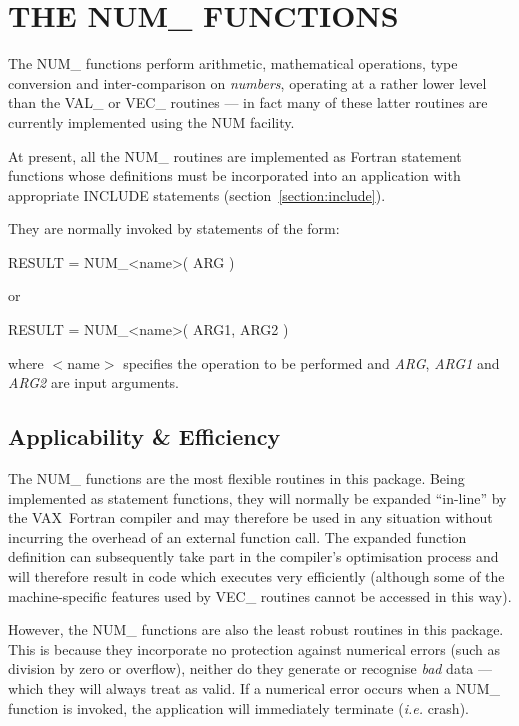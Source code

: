 \documentclass[11pt,nolof]{starlink}
\providecommand{\name}[1]{\mbox{#1}}
\providecommand{\fortvar}[1]{\mbox{\emph{#1}}}
\begin{document}
\section{THE NUM\_ FUNCTIONS}

\label{section:num}

The \name{NUM\_} functions perform arithmetic, mathematical operations, type
conversion and inter-comparison on \emph{numbers}, operating at a rather
lower level than the \name{VAL\_} or \name{VEC\_} routines --- in fact many
of these latter routines are currently implemented using the \name{NUM}
facility.

At present, all the \name{NUM\_} routines are implemented as Fortran
statement functions whose definitions must be incorporated into an
application with appropriate \name{INCLUDE} statements
(section~\ref{section:include}).

They are normally invoked by statements of the form:

\begin{terminalv}
RESULT = NUM_<name>( ARG )
\end{terminalv}
or
\begin{terminalv}
RESULT = NUM_<name>( ARG1, ARG2 )
\end{terminalv}

where \name{$<$name$>$} specifies the operation to be performed and
\fortvar{ARG}, \fortvar{ARG1} and \fortvar{ARG2} are input arguments.

\subsection{Applicability \& Efficiency}

The \name{NUM\_} functions are the most flexible routines in this package.
Being implemented as statement functions, they will normally be expanded
``in-line'' by the \name{VAX}~Fortran compiler and may therefore be used in
any situation without incurring the overhead of an external function call.
The expanded function definition can subsequently take part in the
compiler's optimisation process and will therefore result in code which
executes very efficiently (although some of the machine-specific features
used by \name{VEC\_} routines cannot be accessed in this way).

However, the \name{NUM\_} functions are also the least robust routines in
this package.
This is because they incorporate no protection against numerical errors
(such as division by zero or overflow), neither do they generate or
recognise \emph{bad} data --- which they will always treat as valid.
If a numerical error occurs when a \name{NUM\_} function is invoked, the
application will immediately terminate (\emph{i.e.} crash).
\end{document}
